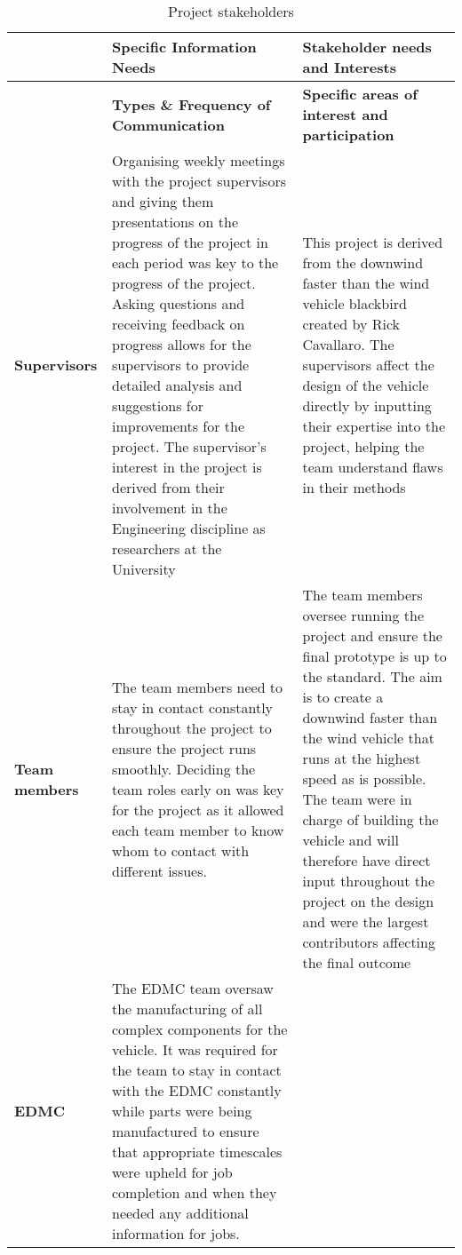 \onecolumn
\begin{table}[p]
\caption{Project stakeholders}
\label{tab:stakeholders}
\centering
\begin{tabular}{|
>{\columncolor[HTML]{\CellColor}}l |p{13cm}|p{13cm}|}
\hline
\cellcolor[HTML]{\CellColor} &
  \cellcolor[HTML]{\CellColor}\textbf{Specific   Information Needs} &
  \cellcolor[HTML]{\CellColor}\textbf{Stakeholder   needs and Interests} \\ \cline{2-3} 
\multirow{-2}{*}{\cellcolor[HTML]{\CellColor}\textbf{Project stakeholder name}} &
  \cellcolor[HTML]{\CellColor}\textbf{Types \& Frequency of   Communication} &
  \cellcolor[HTML]{\CellColor}\textbf{Specific areas of interest and participation} \\ \hline
\textbf{Supervisors} &
  Organising weekly meetings with the project supervisors and giving them presentations on the progress of the project in each period was key to the progress of the project. Asking questions and receiving feedback on progress allows for the supervisors to provide detailed analysis and suggestions for improvements for the project. The supervisor's interest in the project is derived from their involvement in the Engineering discipline as researchers at the University &
  This project is derived from the downwind faster than the wind vehicle blackbird created by Rick Cavallaro. The supervisors affect the design of the vehicle directly by inputting their expertise into the project, helping the team understand flaws in their methods \\ \hline
\textbf{Team members} &
  The team members need to stay in contact constantly throughout the project to ensure the project runs   smoothly. Deciding the team roles early on was key for the project as it allowed each team member to know whom to contact with different issues. &
  The team members oversee running the project and ensure the final prototype is up to the standard. The aim is to create a downwind faster than the wind vehicle that runs at the highest speed as is possible. The team were in charge of building the vehicle and will therefore have direct input throughout the project on the design and were the largest contributors affecting the final outcome \\ \hline
\textbf{EDMC} &
  The EDMC team oversaw the manufacturing of all complex components for the vehicle. It was required for the team to stay in contact with the EDMC constantly while parts were being manufactured to ensure that appropriate timescales were upheld for job completion and when they needed any additional information for jobs. &

\end{tabular}
\end{table}
